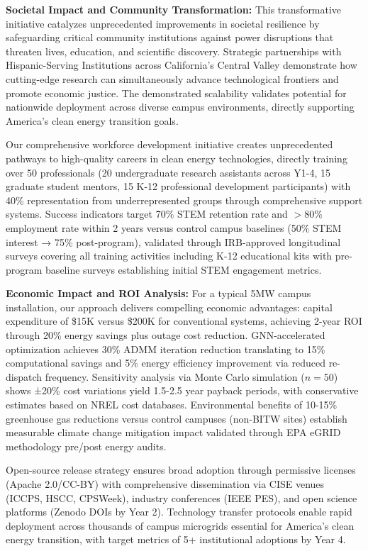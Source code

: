 \documentclass[12pt]{article}
\begin{document}
\textbf{Societal Impact and Community Transformation:} This transformative initiative catalyzes unprecedented improvements in societal resilience by safeguarding critical community institutions against power disruptions that threaten lives, education, and scientific discovery. Strategic partnerships with Hispanic-Serving Institutions across California's Central Valley demonstrate how cutting-edge research can simultaneously advance technological frontiers and promote economic justice. The demonstrated scalability validates potential for nationwide deployment across diverse campus environments, directly supporting America's clean energy transition goals.

Our comprehensive workforce development initiative creates unprecedented pathways to high-quality careers in clean energy technologies, directly training over 50 professionals (20 undergraduate research assistants across Y1-4, 15 graduate student mentors, 15 K-12 professional development participants) with 40\% representation from underrepresented groups through comprehensive support systems. Success indicators target 70\% STEM retention rate and $>$80\% employment rate within 2 years versus control campus baselines (50\% STEM interest → 75\% post-program), validated through IRB-approved longitudinal surveys covering all training activities including K-12 educational kits with pre-program baseline surveys establishing initial STEM engagement metrics.

\textbf{Economic Impact and ROI Analysis:} For a typical 5MW campus installation, our approach delivers compelling economic advantages: capital expenditure of \$15K versus \$200K for conventional systems, achieving 2-year ROI through 20\% energy savings plus outage cost reduction. GNN-accelerated optimization achieves 30\% ADMM iteration reduction translating to 15\% computational savings and 5\% energy efficiency improvement via reduced re-dispatch frequency. Sensitivity analysis via Monte Carlo simulation ($n=50$) shows ±20\% cost variations yield 1.5-2.5 year payback periods, with conservative estimates based on NREL cost databases. Environmental benefits of 10-15\% greenhouse gas reductions versus control campuses (non-BITW sites) establish measurable climate change mitigation impact validated through EPA eGRID methodology pre/post energy audits.

Open-source release strategy ensures broad adoption through permissive licenses (Apache 2.0/CC-BY) with comprehensive dissemination via CISE venues (ICCPS, HSCC, CPSWeek), industry conferences (IEEE PES), and open science platforms (Zenodo DOIs by Year 2). Technology transfer protocols enable rapid deployment across thousands of campus microgrids essential for America's clean energy transition, with target metrics of 5+ institutional adoptions by Year 4.
\end{document}
